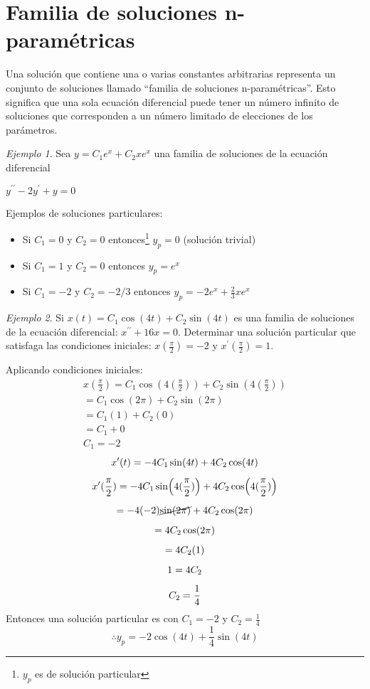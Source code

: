 \documentclass[12pt]{article} %
\theoremstyle{remark} %
\newtheorem{ejemplo}{Ejemplo}[section]
\newcommand{\ed}{ecuación diferencial}
\begin{document}
\section{Familia de soluciones n-paramétricas}
Una solución que contiene una o varias constantes arbitrarias representa un conjunto de soluciones
llamado ``familia de soluciones n-paramétricas''. Esto significa que una sola
ecuación diferencial puede tener un número infinito de soluciones que
corresponden a un número limitado de elecciones de los parámetros.
\begin{ejemplo}
  Sea $y = C_1e^x + C_2xe^x$ una familia de soluciones de la \ed 
 
  $y^{\prime \prime} - 2y^{\prime} + y = 0$

  Ejemplos de soluciones particulares:
  \begin{itemize}
    \item Si $C_1 = 0$ y $C_2 = 0$ entonces\footnote{$y_p$ es de solución particular}
$y_p = 0$ (solución trivial)
    \item Si $C_1 = 1$ y  $C_2 = 0$ entonces $y_p = e^x$
    \item Si $C_1 = -2$ y $C_2 = -2/3$ entonces $y_p = -2e^x + \frac{2}{3} xe^x$
  \end{itemize}
\end{ejemplo}
\begin{ejemplo}
Si $x(t) = C_1 \cos(4t) + C_2 \sin(4t)$ es una familia de soluciones de la \ed :
$x^{\prime \prime} + 16x = 0$. Determinar una solución particular que satisfaga las condiciones iniciales:
$x(\frac{\pi}{2}) = -2$ y $x^{\prime}(\frac{\pi}{2}) = 1$.

Aplicando condiciones iniciales:
\begin{gather*}
  x(\frac{\pi}{2}) = C_1 \cos(4(\frac{\pi}{2})) + C_2 \sin(4(\frac{\pi}{2}))\\[0.5em]
  = C_1 \cos(2 \pi) + C_2 \sin(2 \pi)\\[0.5em]
  = C_1(1) + C_2(0)\\[0.5em]
  =C_1 + 0\\[0.5em]
  C_1 = -2
\end{gather*}
\begin{gather*}
  x^{\prime}(t) = -4 C_1 \sin(4t) + 4 C_2 \cos(4t)\\[0.5em]
  x^{\prime}(\frac{\pi}{2}) = -4 C_1 \sin(4(\frac{\pi}{2})) + 4 C_2 \cos(4(\frac{\pi}{2}))\\[0.5em]
= -4(-2) \cancel{\sin(2 \pi)} + 4 C_2 \cos(2 \pi)\\[0.5em]
= 4 C_2 \cos(2 \pi)\\[0.5em]
= 4 C_2 (1)\\[0.5em]
1 = 4 C_2\\[0.5em]
C_2 = \frac{1}{4}
\end{gather*}
Entonces una solución particular es con $C_1 = -2$ y $C_2 = \frac{1}{4}$
\[ \therefore y_p = -2 \cos(4t) + \frac{1}{4} \sin(4t) \]
\end{ejemplo}
\end{document}
